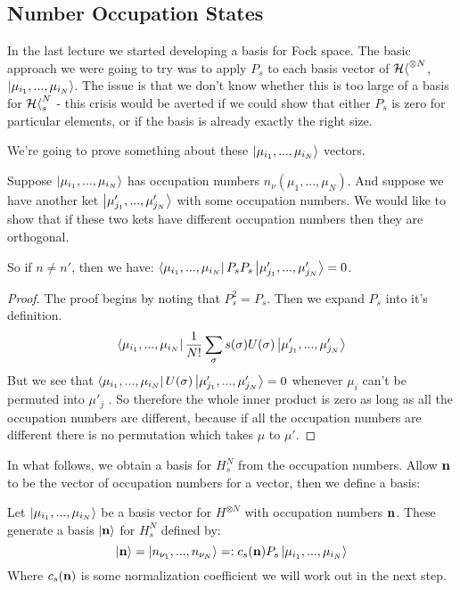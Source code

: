 \subsection{Number Occupation States}
In the last lecture we started developing a basis for Fock space. The basic approach we were going to try was to apply $P_s$ to each basis vector of $\operatorname{\mathcal{Hh}}^{\otimes N}$, $\ket{\mu_{i_1},...,\mu_{i_N}}$. The issue is that we don't know whether this is too large of a basis for $\operatorname{\mathcal{Hh}}_s^N$ - this crisis would be averted if we could show that either $P_s$ is zero for particular elements, or if the basis is already exactly the right size. 

We're going to prove something about these $\ket{\mu_{i_1},...,\mu_{i_N}}$ vectors. 
\begin{prop}
	Suppose $\ket{\mu_{i_1},...,\mu_{i_N}}$ has occupation numbers $n_\nu(\mu_1,...,\mu_N)$. And suppose we have another ket $\ket{\mu'_{j_1},...,\mu'_{j_N}}$ with some occupation numbers. We would like to show that if these two kets have different occupation numbers then they are orthogonal.
\end{prop}

So if $n \neq n'$, then we have: $\bra{\mu_{i_1},...,\mu_{i_N}}P_s P_s \ket{\mu'_{j_1},...,\mu'_{j_N}} = 0$. 

\begin{proof}
	The proof begins by noting that $P_s^2=P_s$. Then we expand $P_s$ into it's definition.
	\[\bra{\mu_{i_1},...,\mu_{i_N}}\frac{1}{N!} \sum_{\sigma} s(\sigma)U(\sigma) \ket{\mu'_{j_1},...,\mu'_{j_N}}\]
	But we see that $\bra{\mu_{i_1},...,\mu_{i_N}}U(\sigma)\ket{\mu'_{j_1},...,\mu'_{j_N}} = 0$ whenever $\mu_{i}$ can't be permuted into $\mu'_j$ . So therefore the whole inner product is zero as long as all the occupation numbers are different, because if all the occupation numbers are different there is no permutation which takes $\mu$ to $\mu'$. 
\end{proof}

In what follows, we obtain a basis for $H_s^N$ from the occupation numbers. Allow $\mathbf{n}$ to be the vector of occupation numbers for a vector, then we define a basis:

\begin{defn}[$H_s^N$ Basis]
Let $\ket{\mu_{i_1},...,\mu_{i_N}}$ be a basis vector for $H^{\otimes N}$ with occupation numbers $\mathbf{n}$. These generate a basis $\ket{\mathbf{n}}$ for $H_s^N$ defined by:
\begin{equation}
\ket{\mathbf{n}} = \ket{n_{\nu_1},...,n_{\nu_N}} =: c_s(\mathbf{n})P_s\ket{\mu_{i_1},...,\mu_{i_N}}
\end{equation}
Where $c_s(\mathbf{n})$ is some normalization coefficient we will work out in the next step.
\end{defn}


